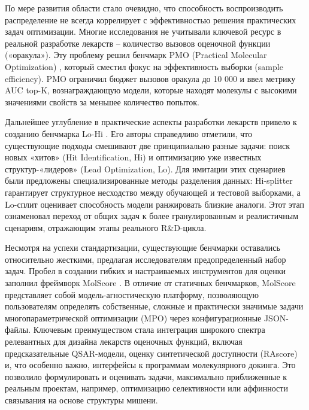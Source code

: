 
По мере развития области стало очевидно, что способность воспроизводить распределение не всегда коррелирует с эффективностью решения практических задач оптимизации. Многие исследования не учитывали ключевой ресурс в реальной разработке лекарств -- количество вызовов оценочной функции («оракула»). Эту проблему решил бенчмарк PMO (Practical Molecular Optimization) \cite{gao2022sample}, который сместил фокус на эффективность выборки (sample efficiency). PMO ограничил бюджет вызовов оракула до 10 000 и ввел метрику AUC top-K, вознаграждающую модели, которые находят молекулы с высокими значениями свойств за меньшее количество попыток.

Дальнейшее углубление в практические аспекты разработки лекарств привело к созданию бенчмарка Lo-Hi \cite{steshin2023hi}. Его авторы справедливо отметили, что существующие подходы смешивают две принципиально разные задачи: поиск новых «хитов» (Hit Identification, Hi) и оптимизацию уже известных структур-«лидеров» (Lead Optimization, Lo). Для имитации этих сценариев были предложены специализированные методы разделения данных: Hi-splitter гарантирует структурное несходство между обучающей и тестовой выборками, а Lo-сплит оценивает способность модели ранжировать близкие аналоги. Этот этап ознаменовал переход от общих задач к более гранулированным и реалистичным сценариям, отражающим этапы реального R&D-цикла.


Несмотря на успехи стандартизации, существующие бенчмарки оставались относительно жесткими, предлагая исследователям предопределенный набор задач. Пробел в создании гибких и настраиваемых инструментов для оценки заполнил фреймворк MolScore \cite{thomas2024molscore}. В отличие от статичных бенчмарков, MolScore представляет собой модель-агностическую платформу, позволяющую пользователям определять собственные, сложные и практически значимые задачи многопараметрической оптимизации (MPO) через конфигурационные JSON-файлы. Ключевым преимуществом стала интеграция широкого спектра релевантных для дизайна лекарств оценочных функций, включая предсказательные QSAR-модели, оценку синтетической доступности (RAscore) и, что особенно важно, интерфейсы к программам молекулярного докинга. Это позволило формулировать и оценивать задачи, максимально приближенные к реальным проектам, например, оптимизацию селективности или аффинности связывания на основе структуры мишени.

